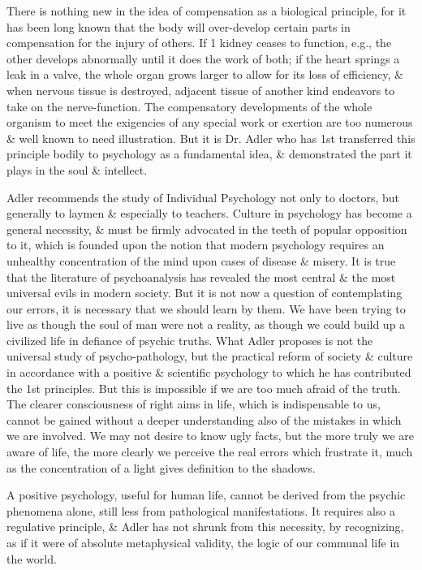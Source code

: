 \documentclass{article}
\numberwithin{equation}{section}
\begin{document}
There is nothing new in the idea of compensation as a biological principle, for it has been long known that the body will over-develop certain parts in compensation for the injury of others. If 1 kidney ceases to function, e.g., the other develops abnormally until it does the work of both; if the heart springs a leak in a valve, the whole organ grows larger to allow for its loss of efficiency, \& when nervous tissue is destroyed, adjacent tissue of another kind endeavors to take on the nerve-function. The compensatory developments of the whole organism to meet the exigencies of any special work or exertion are too numerous \& well known to need illustration. But it is Dr. Adler who has 1st transferred this principle bodily to psychology as a fundamental idea, \& demonstrated the part it plays in the soul \& intellect.

Adler recommends the study of Individual Psychology not only to doctors, but generally to laymen \& especially to teachers. Culture in psychology has become a general necessity, \& must be firmly advocated in the teeth of popular opposition to it, which is founded upon the notion that modern psychology requires an unhealthy concentration of the mind upon cases of disease \& misery. It is true that the literature of psychoanalysis has revealed the most central \& the most universal evils in modern society. But it is not now a question of contemplating our errors, it is necessary that we should learn by them. We have been trying to live as though the soul of man were not a reality, as though we could build up a civilized life in defiance of psychic truths. What Adler proposes is not the universal study of psycho-pathology, but the practical reform of society \& culture in accordance with a positive \& scientific psychology to which he has contributed the 1st principles. But this is impossible if we are too much afraid of the truth. The clearer consciousness of right aims in life, which is indispensable to us, cannot be gained without a deeper understanding also of the mistakes in which we are involved. We may not desire to know ugly facts, but the more truly we are aware of life, the more clearly we perceive the real errors which frustrate it, much as the concentration of a light gives definition to the shadows.

A positive psychology, useful for human life, cannot be derived from the psychic phenomena alone, still less from pathological manifestations. It requires also a regulative principle, \& Adler has not shrunk from this necessity, by recognizing, as if it were of absolute metaphysical validity, the logic of our communal life in the world.
\end{document}
